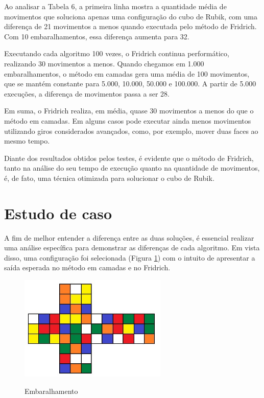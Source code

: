 Ao analisar a Tabela 6, a primeira linha mostra a quantidade média de movimentos que soluciona apenas uma configuração do cubo de Rubik, com uma diferença de 21 movimentos a menos quando executada pelo método de Fridrich. Com 10 embaralhamentos, essa diferença aumenta para 32.

Executando cada algoritmo 100 vezes, o Fridrich continua performático, realizando 30 movimentos a menos. Quando chegamos em 1.000 embaralhamentos, o método em camadas gera uma média de 100 movimentos, que se mantém constante para 5.000, 10.000, 50.000 e 100.000. A partir de 5.000 execuções, a diferença de movimentos passa a ser 28.   

Em suma, o Fridrich realiza, em média, quase 30 movimentos a menos do que o método em camadas. Em alguns casos pode executar ainda menos movimentos utilizando giros considerados avançados, como, por exemplo, mover duas faces ao mesmo tempo.

Diante dos resultados obtidos pelos testes, é evidente que o método de Fridrich, tanto na análise do seu tempo de execução quanto na quantidade de movimentos, é, de fato, uma técnica otimizada para solucionar o cubo de Rubik.


\section{Estudo de caso}


A fim de melhor entender a diferença entre as duas soluções, é essencial realizar uma análise específica para demonstrar as diferenças de cada algoritmo. Em vista disso, uma configuração foi selecionada (Figura \ref{fig:emba}) com o intuito de apresentar a saída esperada no método em camadas e no Fridrich.


\begin{figure}[!htb]
    \centering
    {
        \includegraphics[height=5cm]{imagens/emba2.jpg}
        \label{figFront}
    }
    
\caption{Embaralhamento}
\label{fig:emba}
\end{figure}


